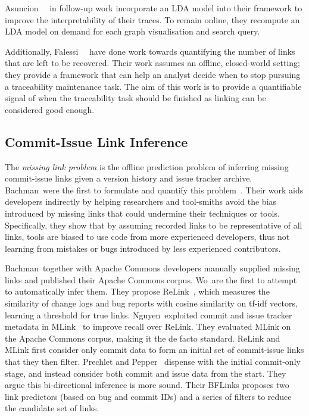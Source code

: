 Asuncion~\etal~\cite{TopicTraceability} in follow-up work incorporate an LDA
model into their framework to improve the interpretability of their traces. To
remain online, they recompute an LDA model on demand for each graph
visualisation and search query.

Additionally, Falessi~\etal~\cite{Falessi2017} have done work towards
quantifying the number of links that are left to be recovered. Their work
assumes an offline, closed-world setting; they provide a framework that can help
an analyst decide when to stop pursuing a traceability maintenance task. The aim
of this work is to provide a quantifiable signal of when the traceability task
should be finished as linking can be considered good enough.


\subsection{Commit-Issue Link Inference}
\label{chapter:literature:sec:am_rel_work:cli}

The \emph{missing link problem} is the offline prediction problem of inferring
missing commit-issue links given a version history and issue tracker archive.
Bachman~\etal were the first to formulate and quantify this
problem~\cite{Bird2009,MissingLinks}. Their work aids developers indirectly by
helping researchers and tool-smiths avoid the bias introduced by missing links
that could undermine their techniques or tools. Specifically, they show that by
assuming recorded links to be representative of all links, tools are biased to
use code from more experienced developers, thus not learning from mistakes or
bugs introduced by less experienced contributors. 

Bachman~\etal together with Apache Commons developers manually supplied missing
links and published their Apache Commons corpus. Wo~\etal are the first to
attempt to automatically infer them. They propose ReLink~\cite{relink}, which
measures the similarity of change logs and bug reports with cosine similarity on
tf-idf vectors, learning a threshold for true links. Nguyen~\etal exploited
commit and issue tracker metadata in MLink~\cite{MLink} to improve recall over
ReLink. They evaluated MLink on the Apache Commons corpus, making it the de
facto standard. ReLink and MLink first consider only commit data to form an
initial set of commit-issue links that they then filter. Prechlet and
Pepper~\cite{prechelt2014bflinks} dispense with the initial commit-only stage,
and instead consider both commit and issue data from the start. They argue this
bi-directional inference is more sound. Their BFLinks proposes two link
predictors (based on bug and commit IDs) and a series of filters to reduce the
candidate set of links.

